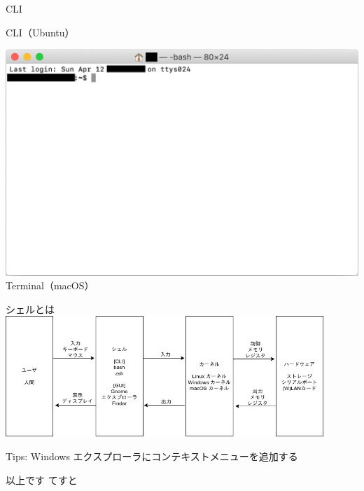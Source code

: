 \documentclass[12pt,aspectratio=169]{beamer}
\begin{document}
\begin{frame}{CLI}
\begin{minipage}{0.3\textwidth}
    CLI（Ubuntu）
  \end{minipage}
  \hfill
  \begin{minipage}{0.3\textwidth}
    \vspace{-5\baselineskip}
    \includegraphics[width=2.0\linewidth,bb=0 0 1144 735]{./images/mac-basic.png}
    Terminal（macOS）
  \end{minipage}

\end{frame}

\begin{frame}{シェルとは}
  \centering
  \includegraphics[width=12cm,bb=0 0 741 281]{./images/shell.png}

\end{frame}


\begin{frame}{Tips: Windows エクスプローラにコンテキストメニューを追加する}

\end{frame}

\begin{frame}{以上です}
てすと

\end{frame}
\end{document}
